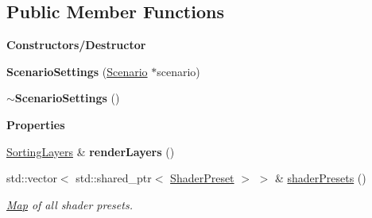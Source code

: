 \subsection*{Public Member Functions}
\begin{Indent}\textbf{ Constructors/\+Destructor}\par
\begin{DoxyCompactItemize}
\item 
\mbox{\label{classrev_1_1_scenario_settings_a4e1c7098beaa9d6431dd39b2bc94e403}} 
{\bfseries Scenario\+Settings} (\mbox{\hyperlink{classrev_1_1_scenario}{Scenario}} $\ast$scenario)
\item 
\mbox{\label{classrev_1_1_scenario_settings_aefb6d8617bde0ffc08b8c501430450a5}} 
{\bfseries $\sim$\+Scenario\+Settings} ()
\end{DoxyCompactItemize}
\end{Indent}
\begin{Indent}\textbf{ Properties}\par
\begin{DoxyCompactItemize}
\item 
\mbox{\label{classrev_1_1_scenario_settings_ae14a7517b873af766cec2263a52462cd}} 
\mbox{\hyperlink{structrev_1_1_sorting_layers}{Sorting\+Layers}} \& {\bfseries render\+Layers} ()
\item 
\mbox{\label{classrev_1_1_scenario_settings_a2ce0288eae4021928c2f3c5d0ff3dc32}} 
std\+::vector$<$ std\+::shared\+\_\+ptr$<$ \mbox{\hyperlink{classrev_1_1_shader_preset}{Shader\+Preset}} $>$ $>$ \& \mbox{\hyperlink{classrev_1_1_scenario_settings_a2ce0288eae4021928c2f3c5d0ff3dc32}{shader\+Presets}} ()
\begin{DoxyCompactList}\small\item\em \mbox{\hyperlink{classrev_1_1_map}{Map}} of all shader presets. \end{DoxyCompactList}\end{DoxyCompactItemize}
\end{Indent}
